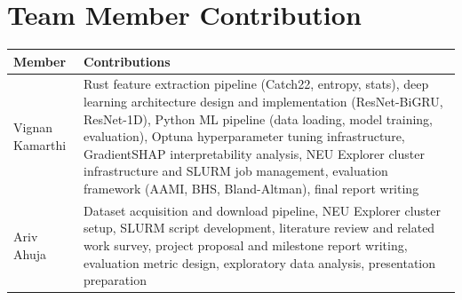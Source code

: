 \documentclass[11pt]{article}
\begin{document}



\section{Team Member Contribution}

\vspace{0.5em}
\noindent
\begin{tabular}{@{}lp{12cm}@{}}
\toprule
\textbf{Member} & \textbf{Contributions} \\
\midrule
Vignan Kamarthi & Rust feature extraction pipeline (Catch22, entropy, stats), deep learning architecture design and implementation (ResNet-BiGRU, ResNet-1D), Python ML pipeline (data loading, model training, evaluation), Optuna hyperparameter tuning infrastructure, GradientSHAP interpretability analysis, NEU Explorer cluster infrastructure and SLURM job management, evaluation framework (AAMI, BHS, Bland-Altman), final report writing \\
\midrule
Ariv Ahuja & Dataset acquisition and download pipeline, NEU Explorer cluster setup, SLURM script development, literature review and related work survey, project proposal and milestone report writing, evaluation metric design, exploratory data analysis, presentation preparation \\
\bottomrule
\end{tabular}
\end{document}
